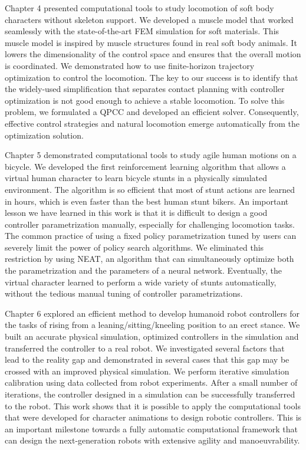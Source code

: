 Chapter 4 presented computational tools to study locomotion of soft body characters without skeleton support. We developed a muscle model that worked seamlessly with the state-of-the-art FEM simulation for soft materials. This muscle model is inspired by muscle structures found in real soft body animals. It lowers the dimensionality of the control space and ensures that the overall motion is coordinated. We demonstrated how to use finite-horizon trajectory optimization to control the locomotion. The key to our success is to identify that the widely-used simplification that separates contact planning with controller optimization is not good enough to achieve a stable locomotion. To solve this problem, we formulated a QPCC and developed an efficient solver. Consequently, effective control strategies and natural locomotion emerge automatically from the optimization solution.

Chapter 5 demonstrated computational tools to study agile human motions on a bicycle. We developed the first reinforcement learning algorithm that allows a virtual human character to learn bicycle stunts in a physically simulated environment. The algorithm is so efficient that most of stunt actions are learned in hours, which is even faster than the best human stunt bikers. An important lesson we have learned in this work is that it is difficult to design a good controller parametrization manually, especially for challenging locomotion tasks. The common practice of using a fixed policy parametrization tuned by users can severely limit the power of policy search algorithms. We eliminated this restriction by using NEAT, an algorithm that can simultaneously optimize both the parametrization and the parameters of a neural network. Eventually, the virtual character learned to perform a wide variety of stunts automatically, without the tedious manual tuning of controller parametrizations.

Chapter 6 explored an efficient method to develop humanoid robot controllers for the tasks of rising from a leaning/sitting/kneeling position to an erect stance. We built an accurate physical simulation, optimized controllers in the simulation and transferred the controller to a real robot. We investigated several factors that lead to the reality gap and demonstrated in several cases that this gap may be crossed with an improved physical simulation. We perform iterative simulation calibration using data collected from robot experiments. After a small number of iterations, the controller designed in a simulation can be successfully transferred to the robot. This work shows that it is possible to apply the computational tools that were developed for character animations to design robotic controllers. This is an important milestone towards a fully automatic computational framework that can design the next-generation robots with extensive agility and manoeuvrability.

